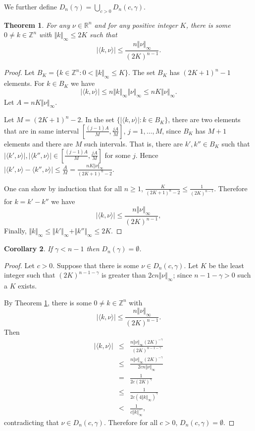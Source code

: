 \documentclass{article}
\newtheorem{theorem}{Theorem}
\newtheorem{corollary}[theorem]{Corollary}
\newcommand{\norm}[1]{\Vert #1 \Vert}
\begin{document}
We further define $D_n(\gamma)=\bigcup_{c>0} D_n(c,\gamma)$.

\begin{theorem}
\label{thm:smallgamma}
For any $\nu \in \mathbb{R}^n$ and for any positive integer $K$, there is some $0 \neq k \in \mathbb{Z}^n$ with $\norm{k}_\infty \leq 2K$
such that 
\[
|\langle k,\nu \rangle | \leq \frac{n\norm{\nu}_\infty}{(2K)^{n-1}}.
\]
\end{theorem}
\begin{proof}
Let $B_K=\{k \in \mathbb{Z}^n: 0<\norm{k}_\infty \leq K\}$. The set $B_K$ has $(2K+1)^n-1$ elements. For
$k \in B_K$ we have
\[
|\langle k,\nu \rangle | \leq n \norm{k}_\infty \norm{\nu}_\infty \leq nK \norm{\nu}_\infty.
\]
Let $A=nK \norm{\nu}_\infty$.

Let $M=(2K+1)^n-2$.  In the set $\{|\langle k,\nu \rangle |: k \in B_K\}$, there are two elements that
are in  same interval $[\frac{(j-1)A}{M},\frac{jA}{M}]$, $j=1,\ldots,M$, since $B_K$ has $M+1$ elements and there
are $M$ such intervals. That is, there are $k',k'' \in B_K$ such that 
$|\langle k',\nu \rangle|, |\langle k'',\nu \rangle| \in [\frac{(j-1)A}{M},\frac{jA}{M}]$ for some $j$. Hence
$|\langle k',\nu \rangle - \langle k'',\nu \rangle| \leq \frac{A}{M}=\frac{nK \norm{\nu}_\infty}{(2K+1)^n-2}$.

One can show by induction that for all $n \geq 1$, $\frac{K}{(2K+1)^n-2} \leq \frac{1}{(2K)^{n-1}}$. Therefore for $k=k'-k''$ we have
\[
|\langle k,\nu \rangle | \leq \frac{n \norm{\nu}_\infty}{(2K)^{n-1}},
\]
Finally, $\norm{k}_\infty \leq \norm{k'}_\infty+\norm{k''}_\infty \leq 2K$.
\end{proof}

\begin{corollary}
If $\gamma<n-1$ then $D_n(\gamma)=\emptyset$.
\end{corollary}
\begin{proof}
Let $c>0$. Suppose that there is some $\nu \in D_n(c,\gamma)$. Let $K$
be the least integer such that $(2K)^{n-1-\gamma}$ is greater than
$2cn \norm{\nu}_\infty$; since $n-1-\gamma>0$ such a $K$ exists.

By Theorem \ref{thm:smallgamma}, there is some $0 \neq k \in \mathbb{Z}^n$ with 
\[
|\langle k,\nu \rangle | \leq \frac{n\norm{\nu}_\infty}{(2K)^{n-1}}.
\]
Then
\begin{eqnarray*}
|\langle k,\nu \rangle |& \leq& \frac{n\norm{\nu}_\infty (2K)^{-\gamma}}{(2K)^{n-1-\gamma}}\\
&\leq&\frac{n\norm{\nu}_\infty (2K)^{-\gamma}}{2cn\norm{\nu}_\infty}\\
&=&\frac{1}{2c(2K)^\gamma}\\
&\leq&\frac{1}{2c(4\norm{k}_\infty)^\gamma}\\
&<&\frac{1}{c\norm{k}_\infty^\gamma},
\end{eqnarray*}
contradicting that $\nu \in D_n(c,\gamma)$. Therefore for all $c>0$,
$D_n(c,\gamma)=\emptyset$.

\end{proof}
\end{document}
